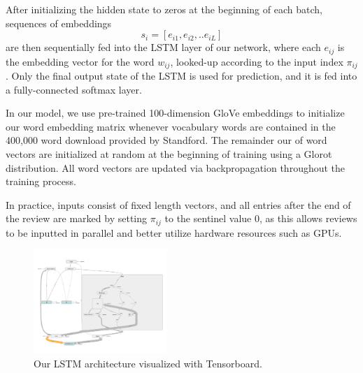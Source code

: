 \documentclass[conference]{IEEEtran}
\begin{document}
    After initializing the hidden state to zeros at the beginning of each batch, sequences
    of embeddings
    $$
    s_i = [ e_{i1}, e_{i2}, .. e_{iL}]
    $$
    are then sequentially fed into the LSTM layer of our network, where each $e_{ij}$ is
    the embedding vector for the word $w_{ij}$, looked-up according to the input index
    $\pi_{ij}$. Only the final output state of the LSTM is used for prediction, and it is
    fed into a fully-connected softmax layer.

    In our model, we use pre-trained 100-dimension GloVe embeddings to initialize
    our word embedding matrix whenever vocabulary words are contained in the
    400,000 word download provided by Standford\cite{pennington2014glove}.
    The remainder our of word vectors are initialized at random at the beginning
    of training using a Glorot distribution\cite{pmlr-v9-glorot10a}.
    All word vectors are updated via backpropagation
    throughout the training process.

    In practice, inputs consist of fixed
    length vectors, and all entries after the end of the review are  marked by setting
    $\pi_{ij}$ to the sentinel value 0, as this allows reviews to be inputted in parallel and
    better utilize hardware resources such as GPUs.

    \begin{figure}
        \includegraphics[width=0.45\textwidth]{figure/lstm_architecture}
        \caption{Our LSTM architecture visualized with Tensorboard.}
    \end{figure}
\end{document}
